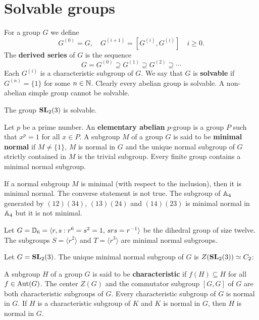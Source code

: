 \chapter{Solvable groups}

For a group $G$ we define 
\[
		G^{(0)}=G,\quad
		G^{(i+1)}=[G^{(i)},G^{(i)}]\quad i\geq0.
\]
The \textbf{derived series} of $G$ is the sequence 
\[
G=G^{(0)}\supseteq G^{(1)}\supseteq G^{(2)}\supseteq\cdots
\]
Each $G^{(i)}$ is a characteristic subgroup of $G$. We say that 
$G$ is \textbf{solvable} if $G^{(n)}=\{1\}$ for some $n\in\mathbb{N}$. Clearly every abelian group
is solvable. A non-abelian simple group cannot be solvable. 

\begin{exercise}
	The group $\mathbf{SL}_2(3)$ is solvable. 
\end{exercise}

Let $p$ be a prime number. An \textbf{elementary abelian} $p$-group is a group 
$P$ such that $x^p=1$ for all $x\in P$.
A subgroup $M$ of a group $G$ is said to be \textbf{minimal normal} if $M\ne\{1\}$,
$M$ is normal in $G$ and the unique normal subgroup of $G$ strictly contained in $M$ is
the trivial subgroup. Every finite group contains a minimal normal subgroup.  


\begin{example}
	If a normal subgroup $M$ is minimal (with respect to the inclusion), then it is
	minimal normal. The converse statement is not true. The subgroup of 
	$\mathbb{A}_4$ generated by $(12)(34)$, $(13)(24)$ and $(14)(23)$ is minimal normal in 
	$\mathbb{A}_4$ but it is not minimal. 
\end{example}

\begin{example}
	Let $G=\mathbb{D}_{6}=\langle r,s:r^6=s^2=1,\,srs=r^{-1}\rangle$ be the dihedral group
	of size twelve. The subgroups $S=\langle r^2\rangle$ 
	and $T=\langle r^3\rangle$ are minimal normal subgroups.  
\end{example}

\begin{exercise}
	Let $G=\mathbf{SL}_2(3)$. The unique minimal normal subgroup of $G$ is
	$Z(\mathbf{SL}_2(3))\simeq C_2$:
\end{exercise}

A subgroup $H$ of a group $G$ is said to be \textbf{characteristic} if 
$f(H)\subseteq H$ for all $f\in\operatorname{Aut}(G)$. 
The center $Z(G)$ and the commutator subgroup $[G,G]$ of $G$ are both 
characteristic subgroups of $G$. Every characteristic subgroup of $G$ is normal in $G$. 
If $H$ is a characteristic subgroup of $K$ and $K$ is normal in $G$, 
then $H$ is normal in $G$. 

